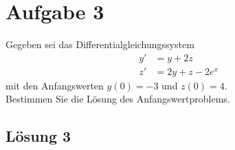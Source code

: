 \documentclass[main.tex]{subfiles}
\begin{document}
\section{Aufgabe 3}
Gegeben sei das Differentialgleichungssystem
\begin{align*}
    y' &= y + 2z \\
    z' &= 2y + z - 2e^x
\end{align*}
mit den Anfangswerten $y(0) = -3$ und $z(0) = 4$. \\[2mm]
Bestimmen Sie die Lösung des Anfangswertproblems.

\subsection{Lösung 3}
\end{document}
